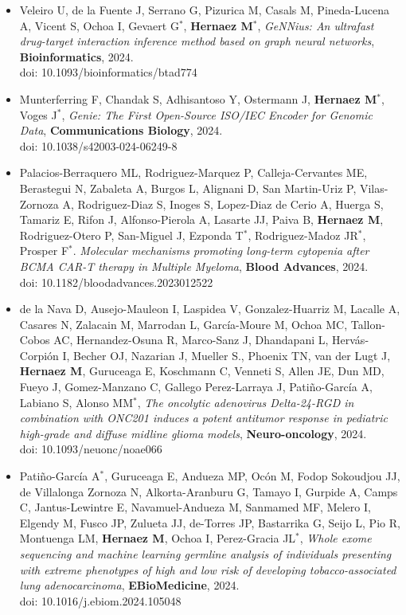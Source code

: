 \documentclass[11pt,a4paper,sans]{moderncv}        %
\begin{document}
\begin{itemize}
\item Veleiro U, de la Fuente J, Serrano G, Pizurica M, Casals M, Pineda-Lucena A, Vicent S, Ochoa I, Gevaert G$^{\ast}$, \textbf{Hernaez M}$^{\ast}$, \textsl{GeNNius: An ultrafast drug-target interaction inference method based on graph neural networks}, \textbf{Bioinformatics}, 2024.\\
doi: 10.1093/bioinformatics/btad774\\

\item Munterferring F, Chandak S, Adhisantoso Y, Ostermann J, \textbf{Hernaez M}$^{\ast}$, Voges J$^{\ast}$, \textsl{Genie: The First Open-Source ISO/IEC Encoder for Genomic Data}, \textbf{Communications Biology}, 2024.\\ 
doi: 10.1038/s42003-024-06249-8\\

\item Palacios-Berraquero ML, Rodriguez-Marquez P, Calleja-Cervantes ME, Berastegui N, Zabaleta A, Burgos L, Alignani D, San Martin-Uriz P, Vilas-Zornoza A, Rodriguez-Diaz S, Inoges S, Lopez-Diaz de Cerio A, Huerga S, Tamariz E, Rifon J, Alfonso-Pierola A, Lasarte JJ, Paiva B, \textbf{Hernaez M}, Rodriguez-Otero P, San-Miguel J, Ezponda T$^{\ast}$,  Rodriguez-Madoz JR$^{\ast}$, Prosper F$^{\ast}$. \textsl{Molecular mechanisms promoting long-term cytopenia after BCMA CAR-T therapy in Multiple Myeloma}, \textbf{Blood Advances}, 2024.\\
doi: 10.1182/bloodadvances.2023012522\\

\item de la Nava D, Ausejo-Mauleon I, Laspidea V, Gonzalez-Huarriz M, Lacalle A, Casares N, Zalacain M, Marrodan L, García-Moure M, Ochoa MC, Tallon-Cobos AC, Hernandez-Osuna R, Marco-Sanz J, Dhandapani L, Hervás-Corpión I, Becher OJ, Nazarian J, Mueller S., Phoenix TN, van der Lugt J, \textbf{Hernaez M}, Guruceaga E, Koschmann C, Venneti S, Allen JE, Dun MD, Fueyo J, Gomez-Manzano C, Gallego Perez-Larraya J, Patiño-García A, Labiano S, Alonso MM$^{\ast}$, \textsl{The oncolytic adenovirus Delta-24-RGD in combination with ONC201 induces a potent antitumor response in pediatric high-grade and diffuse midline glioma models}, \textbf{Neuro-oncology}, 2024.\\
doi: 10.1093/neuonc/noae066\\

\item Patiño-García A$^{\ast}$, Guruceaga E, Andueza MP, Ocón M, Fodop Sokoudjou JJ, de Villalonga Zornoza N, Alkorta-Aranburu G, Tamayo I, Gurpide A, Camps C, Jantus-Lewintre E, Navamuel-Andueza M, Sanmamed MF, Melero I, Elgendy M, Fusco JP, Zulueta JJ, de-Torres JP, Bastarrika G, Seijo L, Pio R, Montuenga LM, \textbf{Hernaez M}, Ochoa I, Perez-Gracia JL$^{\ast}$, \textsl{Whole exome sequencing and machine learning germline analysis of individuals presenting with extreme phenotypes of high and low risk of developing tobacco-associated lung adenocarcinoma}, \textbf{EBioMedicine}, 2024.\\
doi: 10.1016/j.ebiom.2024.105048\\


\end{itemize}
\end{document}
